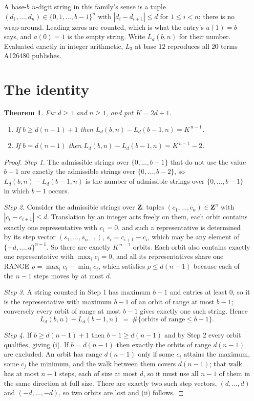 \documentclass[11pt,a4paper]{article}
\theoremstyle{plain}
\newtheorem{theorem}{Theorem}
\theoremstyle{definition}
\begin{document}
A base-$b$ $n$-digit string in this family's sense is a tuple
$(d_1,\dots,d_n)\in\{0,1,\dots,b-1\}^{n}$ with $|d_i-d_{i+1}|\le d$ for $1\le i<n$; there
is no wrap-around. Leading zeros are counted, which is what the entry's $a(1)=b$ says, and
$a(0)=1$ is the empty string. Write $L_d(b,n)$ for their number. Evaluated exactly in integer
arithmetic, $L_{3}$ at base $12$ reproduces all $20$ terms A126480 publishes.

\section{The identity}

\begin{theorem}
Fix $d\ge1$ and $n\ge1$, and put $K=2d+1$.
\begin{enumerate}
\item[(i)] If $b\ge d(n-1)+1$ then $L_d(b,n)-L_d(b-1,n)=K^{\,n-1}$.
\item[(ii)] If $b=d(n-1)$ then $L_d(b,n)-L_d(b-1,n)=K^{\,n-1}-2$.
\end{enumerate}
\end{theorem}

\begin{proof}
\emph{Step 1.} The admissible strings over $\{0,\dots,b-1\}$ that do not use the value $b-1$
are exactly the admissible strings over $\{0,\dots,b-2\}$, so $L_d(b,n)-L_d(b-1,n)$ is the
number of admissible strings over $\{0,\dots,b-1\}$ in which $b-1$ occurs.

\emph{Step 2.} Consider the admissible strings over $\mathbf{Z}$: tuples
$(c_1,\dots,c_n)\in\mathbf{Z}^{n}$ with $|c_i-c_{i+1}|\le d$. Translation by an integer acts
freely on them, each orbit contains exactly one representative with $c_1=0$, and such a
representative is determined by its step vector $(s_1,\dots,s_{n-1})$, $s_i=c_{i+1}-c_i$,
which may be any element of $\{-d,\dots,d\}^{n-1}$. So there are exactly $K^{\,n-1}$ orbits.
Each orbit also contains exactly one representative with $\max_i c_i=0$, and all its
representatives share one RANGE $\rho=\max_ic_i-\min_ic_i$, which satisfies
$\rho\le d(n-1)$ because each of the $n-1$ steps moves by at most $d$.

\emph{Step 3.} A string counted in Step 1 has maximum $b-1$ and entries at least $0$, so it is
the representative with maximum $b-1$ of an orbit of range at most $b-1$; conversely every orbit
of range at most $b-1$ gives exactly one such string. Hence
\[
L_d(b,n)-L_d(b-1,n)\;=\;\#\{\text{orbits of range}\le b-1\} .
\]

\emph{Step 4.} If $b\ge d(n-1)+1$ then $b-1\ge d(n-1)$ and by Step 2 every orbit qualifies,
giving (i). If $b=d(n-1)$ then exactly the orbits of range $d(n-1)$ are excluded. An orbit has
range $d(n-1)$ only if some $c_i$ attains the maximum, some $c_j$ the minimum, and the walk
between them covers $d(n-1)$; that walk has at most $n-1$ steps, each of size at most $d$, so it
must use all $n-1$ of them in the same direction at full size. There are exactly two such step
vectors, $(d,\dots,d)$ and $(-d,\dots,-d)$, so two orbits are lost and (ii) follows.
\end{proof}
\end{document}
